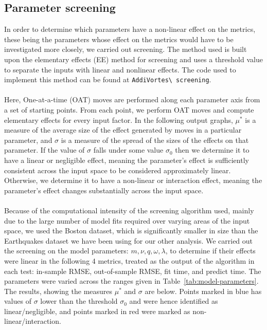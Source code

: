 \documentclass[11pt,twoside,a4paper]{article}
\begin{document}
\subsection{Parameter screening}
In order to determine which parameters have a non-linear effect on the metrics, these being the parameters whose effect on the metrics would have to be investigated more closely, we carried out screening. The method used is built upon the elementary effects (EE) method for screening and uses a threshold value to separate the inputs with linear and nonlinear effects\cite{screening-paper}. The code used to implement this method can be found at \nolinkurl{AddiVortes\ screening}.
\\\\
Here, One-at-a-time (OAT) moves are performed along each parameter axis from a set of starting points. From each point, we perform OAT moves and compute elementary effects for every input factor. In the following output graphs, $\mu^*$ is a measure of the average size of the effect generated by moves in a particular parameter, and $\sigma$ is a measure of the spread of the sizes of the effects on that parameter. If the value of $\sigma$ falls under some value $\sigma_0$ then we determine it to have a linear or negligible effect, meaning the parameter's effect is sufficiently consistent across the input space to be considered approximately linear. Otherwise, we determine it to have a non-linear or interaction effect, meaning the parameter's effect changes substantially across the input space.
\\\\
Because of the computational intensity of the screening algorithm used, mainly due to the large number of model fits required over varying areas of the input space, we used the Boston dataset, which is significantly smaller in size than the Earthquakes dataset we have been using for our other analysis. We carried out the screening on the model parameters: $m, \nu, q, \omega, \lambda$, to determine if their effects were linear in the following 4 metrics, treated as the output of the algorithm in each test: in-sample RMSE, out-of-sample RMSE, fit time, and predict time. The parameters were varied across the ranges given in Table~\ref{tab:model-parameters}. The results, showing the measures $\mu^*$ and $\sigma$ are below. Points marked in blue has values of $\sigma$ lower than the threshold $\sigma_0$ and were hence identified as linear/negligible, and points marked in red were marked as non-linear/interaction.
\end{document}
